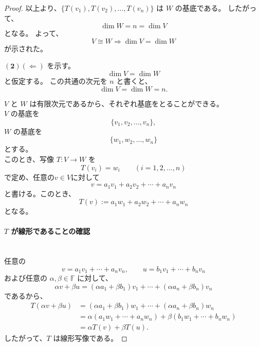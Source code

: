 \documentclass[dvipdfmx,a4paper]{jsarticle}
\theoremstyle{mystyle}
\begin{document}
\begin{proof}
\medskip
\noindent
以上より、$\{T(v_1),T(v_2),\dots,T(v_n)\}$ は $W$ の基底である。
したがって、
\[
\dim W=n=\dim V
\]
となる。
よって、
\[
V\cong W \Longrightarrow \dim V=\dim W
\]
が示された。

\vspace{1em}

\noindent
$\mathbf{(2)}$\quad $(\Leftarrow)$ を示す。
\[
\dim V=\dim W
\]
と仮定する。
この共通の次元を $n$ と書くと、
\[
\dim V=\dim W=n.
\]

\medskip
\noindent
$V$ と $W$ は有限次元であるから、それぞれ基底をとることができる。\\
\noindent
$V$ の基底を
\[
\{v_1,v_2,\dots,v_n\},
\]
$W$ の基底を
\[
\{w_1,w_2,\dots,w_n\}
\]
とする。\\
\noindent
このとき、写像 $T:V\to W$ を
\[
T(v_i)=w_i\qquad (i=1,2,\dots,n)
\]
で定め、任意の$v\in V$に対して
\[
v=a_1v_1+a_2v_2+\cdots+a_nv_n
\]
と書ける。このとき、
\[
T(v):=a_1w_1+a_2w_2+\cdots+a_nw_n
\]
となる。


\paragraph{\textbf{$T$ が線形であることの確認}} \ \\
任意の
\[
v=a_1v_1+\cdots+a_nv_n,\qquad
u=b_1v_1+\cdots+b_nv_n
\]
および任意の $\alpha,\beta\in\mathbb{F}$ に対して、
\[
\alpha v+\beta u
=
(\alpha a_1+\beta b_1)v_1+\cdots+(\alpha a_n+\beta b_n)v_n
\]
であるから、
\begin{align*}
T(\alpha v+\beta u)
&=
(\alpha a_1+\beta b_1)w_1+\cdots+(\alpha a_n+\beta b_n)w_n\\
&=
\alpha(a_1w_1+\cdots+a_nw_n)+\beta(b_1w_1+\cdots+b_nw_n)\\
&=
\alpha T(v)+\beta T(u).
\end{align*}
したがって、$T$ は線形写像である。


\end{proof}
\end{document}
